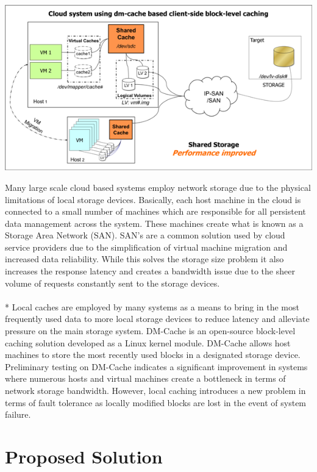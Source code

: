\documentclass[letterpaper,12pt]{article}
\begin{document}
\begin{center}
  \includegraphics{../Images/NewerImage.png}
\end{center}
\noindent
Many large scale cloud based systems employ network storage due to the
physical limitations of local storage devices. Basically, each host
machine in the cloud is connected to a small number of machines which
are responsible for all persistent data management across the system.
These machines create what is known as a Storage Area Network (SAN).
SAN's are a common solution used by cloud service providers due to the
simplification of virtual machine migration and increased data
reliability. While this solves the storage size problem it also
increases the response latency and creates a bandwidth issue due to
the sheer volume of requests constantly sent to the storage devices.
\\ \\*
%
Local caches are employed by many systems as a means to bring in the
most frequently used data to more local storage devices to reduce
latency and alleviate pressure on the main storage system. DM-Cache is
an open-source block-level caching solution developed as a Linux
kernel module. DM-Cache allows host machines to store the most
recently used blocks in a designated storage device. Preliminary
testing on DM-Cache indicates a significant improvement in systems
where numerous hosts and virtual machines create a bottleneck in terms
of network storage bandwidth. However, local caching introduces a new
problem in terms of fault tolerance as locally modified blocks are lost
in the event of system failure.


\section*{Proposed Solution}
\end{document}

